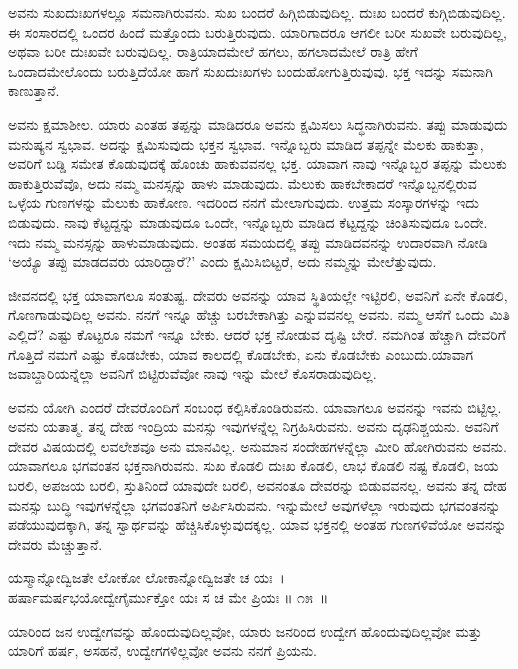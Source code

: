ಅವನು ಸುಖದುಃಖಗಳಲ್ಲೂ ಸಮನಾಗಿರುವನು. ಸುಖ ಬಂದರೆ ಹಿಗ್ಗಿಬಿಡುವುದಿಲ್ಲ. ದುಃಖ ಬಂದರೆ ಕುಗ್ಗಿಬಿಡುವುದಿಲ್ಲ. ಈ ಸಂಸಾರದಲ್ಲಿ ಒಂದರ ಹಿಂದೆ ಮತ್ತೊಂದು ಬರುತ್ತಿರುವುದು. ಯಾರಿಗಾದರೂ ಆಗಲೀ ಬರೀ ಸುಖವೇ ಬರುವುದಿಲ್ಲ, ಅಥವಾ ಬರೀ ದುಃಖವೇ ಬರುವುದಿಲ್ಲ. ರಾತ್ರಿಯಾದಮೇಲೆ ಹಗಲು, ಹಗಲಾದಮೇಲೆ ರಾತ್ರಿ ಹೇಗೆ ಒಂದಾದಮೇಲೊಂದು ಬರುತ್ತಿದೆಯೋ ಹಾಗೆ ಸುಖದುಃಖಗಳು ಬಂದುಹೋಗುತ್ತಿರುವುವು. ಭಕ್ತ ಇದನ್ನು ಸಮನಾಗಿ ಕಾಣುತ್ತಾನೆ.

ಅವನು ಕ್ಷಮಾಶೀಲ. ಯಾರು ಎಂತಹ ತಪ್ಪನ್ನು ಮಾಡಿದರೂ ಅವನು ಕ್ಷಮಿಸಲು ಸಿದ್ಧ\-ನಾಗಿರುವನು. ತಪ್ಪು ಮಾಡುವುದು ಮನುಷ್ಯನ ಸ್ವಭಾವ. ಅದನ್ನು ಕ್ಷಮಿಸುವುದು ಭಕ್ತನ ಸ್ವಭಾವ. ಇನ್ನೊಬ್ಬರು ಮಾಡಿದ ತಪ್ಪನ್ನೇ ಮೆಲಕು ಹಾಕುತ್ತಾ, ಅವರಿಗೆ ಬಡ್ಡಿ ಸಮೇತ ಕೊಡುವುದಕ್ಕೆ ಹೊಂಚು ಹಾಕುವವನಲ್ಲ ಭಕ್ತ. ಯಾವಾಗ ನಾವು ಇನ್ನೊಬ್ಬರ ತಪ್ಪನ್ನು ಮೆಲುಕು ಹಾಕುತ್ತಿರುವೆವೊ, ಅದು ನಮ್ಮ ಮನಸ್ಸನ್ನು ಹಾಳು ಮಾಡುವುದು. ಮೆಲುಕು ಹಾಕಬೇಕಾದರೆ ಇನ್ನೊಬ್ಬನಲ್ಲಿರುವ ಒಳ್ಳೆಯ ಗುಣಗಳನ್ನು ಮೆಲುಕು ಹಾಕೋಣ. ಇದರಿಂದ ನನಗೆ ಮೇಲಾಗುವುದು. ಉತ್ತಮ ಸಂಸ್ಕಾರಗಳನ್ನು ಇದು ಬಿಡುವುದು. ನಾವು ಕೆಟ್ಟದ್ದನ್ನು ಮಾಡುವುದೂ ಒಂದೇ, ಇನ್ನೊಬ್ಬರು ಮಾಡಿದ ಕೆಟ್ಟದ್ದನ್ನು ಚಿಂತಿಸುವುದೂ ಒಂದೇ. ಇದು ನಮ್ಮ ಮನಸ್ಸನ್ನು ಹಾಳುಮಾಡುವುದು. ಅಂತಹ ಸಮಯದಲ್ಲಿ ತಪ್ಪು ಮಾಡಿದವನನ್ನು ಉದಾರವಾಗಿ ನೋಡಿ ‘ಅಯ್ಯೊ ತಪ್ಪು ಮಾಡದವರು ಯಾರಿದ್ದಾರೆ?’ ಎಂದು ಕ್ಷಮಿಸಿಬಿಟ್ಟರೆ, ಅದು ನಮ್ಮನ್ನು ಮೇಲೆತ್ತುವುದು.

ಜೀವನದಲ್ಲಿ ಭಕ್ತ ಯಾವಾಗಲೂ ಸಂತುಷ್ಟ. ದೇವರು ಅವನನ್ನು ಯಾವ ಸ್ಥಿತಿಯಲ್ಲೇ ಇಟ್ಟಿರಲಿ, ಅವನಿಗೆ ಏನೇ ಕೊಡಲಿ, ಗೊಣಗಾಡುವುದಿಲ್ಲ ಅವನು. ನನಗೆ ಇನ್ನೂ ಹೆಚ್ಚು ಬರಬೇಕಾಗಿತ್ತು ಎನ್ನುವವನಲ್ಲ ಅವನು. ನಮ್ಮ ಆಸೆಗೆ ಒಂದು ಮಿತಿ ಎಲ್ಲಿದೆ? ಎಷ್ಟು ಕೊಟ್ಟರೂ ನಮಗೆ ಇನ್ನೂ ಬೇಕು. ಆದರೆ ಭಕ್ತ ನೋಡುವ ದೃಷ್ಟಿ ಬೇರೆ. ನಮಗಿಂತ ಹೆಚ್ಚಾಗಿ ದೇವರಿಗೆ ಗೊತ್ತಿದೆ ನಮಗೆ ಎಷ್ಟು ಕೊಡಬೇಕು, ಯಾವ ಕಾಲದಲ್ಲಿ ಕೊಡಬೇಕು, ಏನು ಕೊಡಬೇಕು ಎಂಬುದು.\break ಯಾವಾಗ ಜವಾಬ್ದಾರಿಯನ್ನೆಲ್ಲಾ ಅವನಿಗೆ ಬಿಟ್ಟಿರುವೆವೋ ನಾವು ಇನ್ನು ಮೇಲೆ ಕೊಸರಾಡುವುದಿಲ್ಲ.

ಅವನು ಯೋಗಿ ಎಂದರೆ ದೇವರೊಂದಿಗೆ ಸಂಬಂಧ ಕಲ್ಪಿಸಿಕೊಂಡಿರುವನು. ಯಾವಾಗಲೂ ಅವನನ್ನು ಇವನು ಬಿಟ್ಟಿಲ್ಲ. ಅವನು ಯತಾತ್ಮ. ತನ್ನ ದೇಹ ಇಂದ್ರಿಯ ಮನಸ್ಸು ಇವುಗಳನ್ನೆಲ್ಲ ನಿಗ್ರಹಿಸಿರುವನು. ಅವನು ದೃಢನಿಶ್ಚಯನು. ಅವನಿಗೆ ದೇವರ ವಿಷಯದಲ್ಲಿ ಲವಲೇಶವೂ ಅನು ಮಾನವಿಲ್ಲ. ಅನುಮಾನ ಸಂದೇಹಗಳನ್ನೆಲ್ಲಾ ಮೀರಿ ಹೋಗಿರುವನು ಅವನು. ಯಾವಾಗಲೂ ಭಗವಂತನ ಭಕ್ತನಾಗಿರುವನು. ಸುಖ ಕೊಡಲಿ ದುಃಖ ಕೊಡಲಿ, ಲಾಭ ಕೊಡಲಿ ನಷ್ಟ ಕೊಡಲಿ, ಜಯ ಬರಲಿ, ಅಪಜಯ ಬರಲಿ, ಸ್ತುತಿನಿಂದೆ ಯಾವುದೇ ಬರಲಿ, ಅವನಂತೂ ದೇವರನ್ನು ಬಿಡುವವನಲ್ಲ. ಅವನು ತನ್ನ ದೇಹ ಮನಸ್ಸು ಬುದ್ಧಿ ಇವುಗಳನ್ನೆಲ್ಲಾ ಭಗವಂತನಿಗೆ ಅರ್ಪಿಸಿರುವನು. ಇನ್ನುಮೇಲೆ ಅವುಗಳೆಲ್ಲಾ ಇರುವುದು ಭಗವಂತನನ್ನು ಪಡೆಯುವುದಕ್ಕಾಗಿ, ತನ್ನ ಸ್ವಾರ್ಥವನ್ನು ಹೆಚ್ಚಿಸಿಕೊಳ್ಳುವುದಕ್ಕಲ್ಲ. ಯಾವ ಭಕ್ತನಲ್ಲಿ ಅಂತಹ ಗುಣಗಳಿವೆಯೋ ಅವನನ್ನು ದೇವರು ಮೆಚ್ಚುತ್ತಾನೆ.

\begin{shloka}
ಯಸ್ಮಾನ್ನೋದ್ವಿಜತೇ ಲೋಕೋ ಲೋಕಾನ್ನೋದ್ವಿಜತೇ ಚ ಯಃ~।\\ಹರ್ಷಾಮರ್ಷಭಯೋದ್ವೇಗೈರ್ಮುಕ್ತೋ ಯಃ ಸ ಚ ಮೇ ಪ್ರಿಯಃ \hfill॥ ೧೫~॥
\end{shloka}

\begin{artha}
ಯಾರಿಂದ ಜನ ಉದ್ವೇಗವನ್ನು ಹೊಂದುವುದಿಲ್ಲವೋ, ಯಾರು ಜನರಿಂದ ಉದ್ವೇಗ ಹೊಂದುವು\-ದಿಲ್ಲವೋ ಮತ್ತು ಯಾರಿಗೆ ಹರ್ಷ, ಅಸಹನೆ, ಉದ್ವೇಗಗಳಿಲ್ಲವೋ ಅವನು ನನಗೆ ಪ್ರಿಯನು.
\end{artha}

